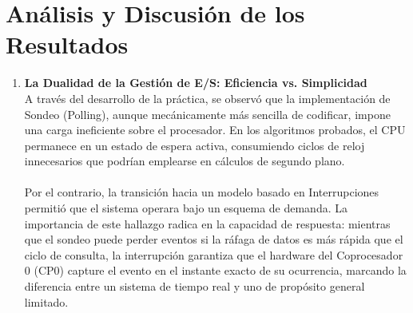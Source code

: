 \documentclass[]{article}
\begin{document}
\section{Análisis y Discusión de los Resultados}
	\begin{enumerate}
		\item \textbf{La Dualidad de la Gestión de E/S: Eficiencia vs. Simplicidad}\\
			A través del desarrollo de la práctica, se observó que la implementación de Sondeo (Polling), aunque mecánicamente más sencilla de codificar, impone una carga ineficiente sobre el procesador. En los algoritmos probados, el CPU permanece en un estado de espera activa, consumiendo ciclos de reloj innecesarios que podrían emplearse en cálculos de segundo plano.
			\\\\
			Por el contrario, la transición hacia un modelo basado en Interrupciones permitió que el sistema operara bajo un esquema de demanda. La importancia de este hallazgo radica en la capacidad de respuesta: mientras que el sondeo puede perder eventos si la ráfaga de datos es más rápida que el ciclo de consulta, la interrupción garantiza que el hardware del Coprocesador 0 (CP0) capture el evento en el instante exacto de su ocurrencia, marcando la diferencia entre un sistema de tiempo real y uno de propósito general limitado.
			

\end{enumerate}
\end{document}
